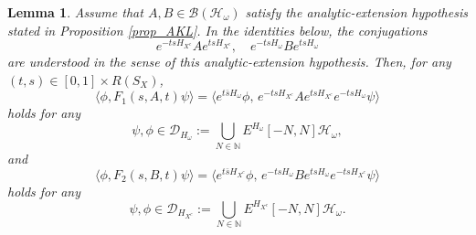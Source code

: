 \documentclass[11pt]{article}
\numberwithin{equation}{section}
\newtheorem{lemma}[theorem]{Lemma}
\begin{document}
\medskip
\begin{lemma}\label{lem_infinite}
Assume that $A,B\in\mathcal{B}(\mathcal{H}_\omega)$ satisfy the analytic-extension hypothesis stated in Proposition \ref{prop_AKL}. In the identities below, the conjugations
\[
e^{-tsH_{X^c}}Ae^{tsH_{X^c}},\quad e^{-tsH_\omega}Be^{tsH_\omega}
\]
are understood in the sense of this analytic-extension hypothesis. Then, for any $(t,s)\in [0,1]\times R(S_X)$,
\[
\langle\phi,F_1(s,A,t)\psi\rangle=\langle e^{t\bar{s}H_\omega}\phi,\, e^{-ts H_{X^c}}A e^{ts H_{X^c}}e^{-tsH_\omega}\psi\rangle
\]
holds for any
\[
\psi,\phi\in\mathcal{D}_{H_\omega}:= \bigcup_{N\in\mathbb{N}} E^{H_\omega}[-N,N]\mathcal{H}_\omega,
\]
and
\[
\langle\phi,F_2(s,B,t)\psi\rangle=\langle e^{t\bar{s}H_{X^c}}\phi,\,e^{-tsH_\omega}Be^{tsH_\omega}e^{-tsH_{X^c}}\psi\rangle
\]
holds for any
\[
\psi,\phi\in\mathcal{D}_{H_{X^c}}
:=\bigcup_{N\in\mathbb{N}} E^{H_{X^c}}[-N,N]\mathcal{H}_\omega.
\]
\end{lemma}
\end{document}
